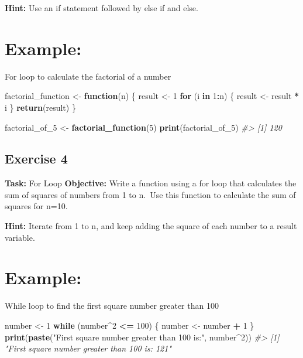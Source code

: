 \documentclass[
]{book}
\newenvironment{Shaded}{\begin{snugshade}}{\end{snugshade}}
\newcommand{\CommentTok}[1]{\textcolor[rgb]{0.56,0.35,0.01}{\textit{#1}}}
\newcommand{\ControlFlowTok}[1]{\textcolor[rgb]{0.13,0.29,0.53}{\textbf{#1}}}
\newcommand{\DecValTok}[1]{\textcolor[rgb]{0.00,0.00,0.81}{#1}}
\newcommand{\FunctionTok}[1]{\textcolor[rgb]{0.13,0.29,0.53}{\textbf{#1}}}
\newcommand{\NormalTok}[1]{#1}
\newcommand{\OtherTok}[1]{\textcolor[rgb]{0.56,0.35,0.01}{#1}}
\newcommand{\SpecialCharTok}[1]{\textcolor[rgb]{0.81,0.36,0.00}{\textbf{#1}}}
\newcommand{\StringTok}[1]{\textcolor[rgb]{0.31,0.60,0.02}{#1}}
\begin{document}
\textbf{Hint:} Use an if statement followed by else if and else.

\section*{Example:}\label{example-6}

For loop to calculate the factorial of a number

\begin{Shaded}
\begin{Highlighting}[]

\NormalTok{factorial\_function }\OtherTok{\textless{}{-}} \ControlFlowTok{function}\NormalTok{(n) \{}
\NormalTok{  result }\OtherTok{\textless{}{-}} \DecValTok{1}
  \ControlFlowTok{for}\NormalTok{ (i }\ControlFlowTok{in} \DecValTok{1}\SpecialCharTok{:}\NormalTok{n) \{}
\NormalTok{    result }\OtherTok{\textless{}{-}}\NormalTok{ result }\SpecialCharTok{*}\NormalTok{ i}
\NormalTok{  \}}
  \FunctionTok{return}\NormalTok{(result)}
\NormalTok{\}}

\NormalTok{factorial\_of\_5 }\OtherTok{\textless{}{-}} \FunctionTok{factorial\_function}\NormalTok{(}\DecValTok{5}\NormalTok{)}
\FunctionTok{print}\NormalTok{(factorial\_of\_5)}
\CommentTok{\#\textgreater{} [1] 120}
\end{Highlighting}
\end{Shaded}

\subsection*{Exercise 4}\label{exercise-4-1}

\textbf{Task:} For Loop
\textbf{Objective:} Write a function using a for loop that calculates the sum of squares of numbers from 1 to n.~Use this function to calculate the sum of squares for n=10.

\textbf{Hint:} Iterate from 1 to n, and keep adding the square of each number to a result variable.

\section*{Example:}\label{example-7}

While loop to find the first square number greater than 100

\begin{Shaded}
\begin{Highlighting}[]
\NormalTok{number }\OtherTok{\textless{}{-}} \DecValTok{1}
\ControlFlowTok{while}\NormalTok{ (number}\SpecialCharTok{\^{}}\DecValTok{2} \SpecialCharTok{\textless{}=} \DecValTok{100}\NormalTok{) \{}
\NormalTok{  number }\OtherTok{\textless{}{-}}\NormalTok{ number }\SpecialCharTok{+} \DecValTok{1}
\NormalTok{\}}
\FunctionTok{print}\NormalTok{(}\FunctionTok{paste}\NormalTok{(}\StringTok{"First square number greater than 100 is:"}\NormalTok{, number}\SpecialCharTok{\^{}}\DecValTok{2}\NormalTok{))}
\CommentTok{\#\textgreater{} [1] "First square number greater than 100 is: 121"}
\end{Highlighting}
\end{Shaded}
\end{document}

